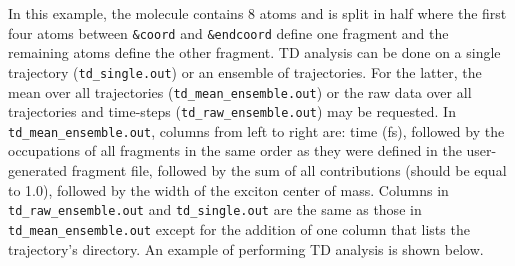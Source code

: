 \documentclass[letterpaper,12pt,titlepage]{article}
\begin{document}
In this example, the molecule contains 8 atoms and is split in half where the first four atoms between \verb+&coord+ and \verb+&endcoord+ define one fragment and the remaining atoms define the other fragment.  TD analysis can be done on a single trajectory (\verb+td_single.out+) or an ensemble of trajectories.  For the latter, the mean over all trajectories (\verb+td_mean_ensemble.out+) or the raw data over all trajectories and time-steps (\verb+td_raw_ensemble.out+) may be requested.  In \verb+td_mean_ensemble.out+, columns from left to right are: time (fs), followed by the occupations of all fragments in the same order as they were defined in the user-generated fragment file, followed by the sum of all contributions (should be equal to 1.0), followed by the width of the exciton center of mass.  Columns in \verb+td_raw_ensemble.out+ and \verb+td_single.out+ are the same as those in \verb+td_mean_ensemble.out+ except for the addition of one column that lists the trajectory's directory.  An example of performing TD analysis is shown below.
\end{document}
